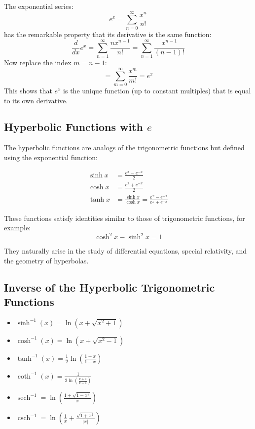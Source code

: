 The exponential series:
\[
e^x = \sum_{n=0}^{\infty} \frac{x^n}{n!}
\]
has the remarkable property that its derivative is the same function:
\[
\frac{d}{dx} e^x = \sum_{n=1}^{\infty} \frac{n x^{n-1}}{n!} = \sum_{n=1}^{\infty} \frac{x^{n-1}}{(n-1)!}
\]
Now replace the index \(m = n - 1\):
\[
= \sum_{m=0}^{\infty} \frac{x^m}{m!} = e^x
\]
This shows that \(e^x\) is the unique function (up to constant multiples) that is equal to its own derivative.

\subsection{Hyperbolic Functions with \texorpdfstring{\(e\)}{e}}

The hyperbolic functions are analogs of the trigonometric functions but defined using the exponential function:

\begin{align*}
\sinh x &= \frac{e^x - e^{-x}}{2} \\
\cosh x &= \frac{e^x + e^{-x}}{2} \\
\tanh x &= \frac{\sinh x}{\cosh x} = \frac{e^x - e^{-x}}{e^x + e^{-x}}
\end{align*}

These functions satisfy identities similar to those of trigonometric functions, for example:
\[
\cosh^2 x - \sinh^2 x = 1
\]

They naturally arise in the study of differential equations, special relativity, and the geometry of hyperbolas.

\subsection{Inverse of the Hyperbolic Trigonometric Functions}

\begin{itemize}[label=\(-\)]
    \item \(\sinh^{-1}(x) = \ln(x + \sqrt{x^2 + 1})\)
    \item \(\cosh^{-1}(x) = \ln(x + \sqrt{x^2 - 1})\)
    \item \(\tanh^{-1}(x) = \frac{1}{2} \ln\left(\frac{1 + x}{1 - x}\right)\)
    \item \(\coth^{-1}(x) = \frac{1}{2 \ln\left(\frac{x + 1}{x - 1}\right)}\)
    \item \(\operatorname{sech}^{-1} = \ln\left(\frac{1 + \sqrt{1 - x^2}}{x}\right)\)
    \item \(\operatorname{csch}^{-1} = \ln\left( \frac{1}{x} + \frac{\sqrt{1 + x^2}}{|x|}\right)\) 
\end{itemize}
\newpage